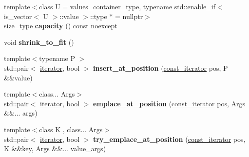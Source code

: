 \begin{DoxyCompactItemize}
\item 
\mbox{\label{classtsl_1_1detail__ordered__hash_1_1ordered__hash_ad1855b56d175636b77cb25644e04e63a}} 
{\footnotesize template$<$class U  = values\+\_\+container\+\_\+type, typename std\+::enable\+\_\+if$<$ is\+\_\+vector$<$ U $>$\+::value $>$\+::type $\ast$  = nullptr$>$ }\\size\+\_\+type {\bfseries capacity} () const noexcept
\item 
\mbox{\label{classtsl_1_1detail__ordered__hash_1_1ordered__hash_a003efec6736ac7959c49f70e06dc4d67}} 
void {\bfseries shrink\+\_\+to\+\_\+fit} ()
\item 
\mbox{\label{classtsl_1_1detail__ordered__hash_1_1ordered__hash_a663f448668304bb3940f7e1c8e58d0e5}} 
{\footnotesize template$<$typename P $>$ }\\std\+::pair$<$ \mbox{\hyperlink{classtsl_1_1detail__ordered__hash_1_1ordered__hash_1_1ordered__iterator}{iterator}}, bool $>$ {\bfseries insert\+\_\+at\+\_\+position} (\mbox{\hyperlink{classtsl_1_1detail__ordered__hash_1_1ordered__hash_1_1ordered__iterator}{const\+\_\+iterator}} pos, P \&\&value)
\item 
\mbox{\label{classtsl_1_1detail__ordered__hash_1_1ordered__hash_a88e61ed4deea6239cc78385f6cac3030}} 
{\footnotesize template$<$class... Args$>$ }\\std\+::pair$<$ \mbox{\hyperlink{classtsl_1_1detail__ordered__hash_1_1ordered__hash_1_1ordered__iterator}{iterator}}, bool $>$ {\bfseries emplace\+\_\+at\+\_\+position} (\mbox{\hyperlink{classtsl_1_1detail__ordered__hash_1_1ordered__hash_1_1ordered__iterator}{const\+\_\+iterator}} pos, Args \&\&... args)
\item 
\mbox{\label{classtsl_1_1detail__ordered__hash_1_1ordered__hash_ab75bd413ef58e6261c41f8907b228756}} 
{\footnotesize template$<$class K , class... Args$>$ }\\std\+::pair$<$ \mbox{\hyperlink{classtsl_1_1detail__ordered__hash_1_1ordered__hash_1_1ordered__iterator}{iterator}}, bool $>$ {\bfseries try\+\_\+emplace\+\_\+at\+\_\+position} (\mbox{\hyperlink{classtsl_1_1detail__ordered__hash_1_1ordered__hash_1_1ordered__iterator}{const\+\_\+iterator}} pos, K \&\&key, Args \&\&... value\+\_\+args)

\end{DoxyCompactItemize}
